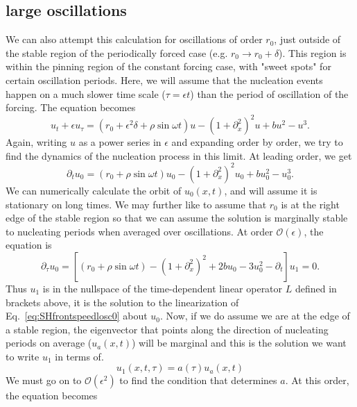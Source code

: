 \documentclass[pre,preprint,superscriptaddress]{revtex4-1}
\begin{document}
\subsection{large oscillations}
We can also attempt this calculation for oscillations of order $r_0$, just outside of the stable region of the periodically forced case (e.g. $r_0\rightarrow r_0+\delta$).  This region is within the pinning region of the constant forcing case, with "sweet spots" for certain oscillation periods.  Here, we will assume that the nucleation events happen on a much slower time scale ($\tau=\epsilon t$) than the period of oscillation of the forcing.  The equation becomes
\begin{equation}
u_t+ \epsilon u_{\tau}=(r_0+\epsilon^2 \delta + \rho \sin\omega t) u-\left(1+\partial_{x}^2\right)^2u+b u^2-u^3 \label{eq:SH}.
\end{equation}
Again, writing $u$ as a power series in $\epsilon$ and expanding order by order, we try to find the dynamics of the nucleation process in this limit.  At leading order, we get
\begin{equation}
\partial_t u_0=(r_0 + \rho \sin\omega t) u_0-\left(1+\partial_{x}^2\right)^2u_0+b u_0^2-u_0^3 \label{eq:SHfrontspeedlosc0}.
\end{equation}
We can numerically calculate the orbit of $u_0(x,t)$, and will assume it is stationary on long times.  We may further like to assume that $r_0$ is at the right edge of the stable region so that we can assume the solution is marginally stable to nucleating periods when averaged over oscillations.  At order $\mathcal{O}(\epsilon)$, the equation is
 \begin{equation}
\partial_{\tau} u_0=\left[(r_0 + \rho \sin\omega t) -\left(1+\partial_{x}^2\right)^2+2 b u_0-3u_0^2 -\partial_t\right] u_1 = 0 \label{eq:SH}.
\end{equation} 
Thus $u_1$ is in the nullspace of the time-dependent linear operator $L$ defined in brackets above, it is the solution to the linearization of Eq.~\ref{eq:SHfrontspeedlosc0} about $u_0$. Now, if we do assume we are at the edge of a stable region, the eigenvector that points along the direction of nucleating periods on average ($u_a(x,t)$) will be marginal and this is the solution we want to write $u_1$ in terms of. 
 \begin{equation}
u_1(x,t,\tau)=a(\tau) u_a(x,t)
\end{equation}
We must go on to $\mathcal{O}(\epsilon^2)$ to find the condition that determines $a$.  At this order, the equation becomes
\end{document}
